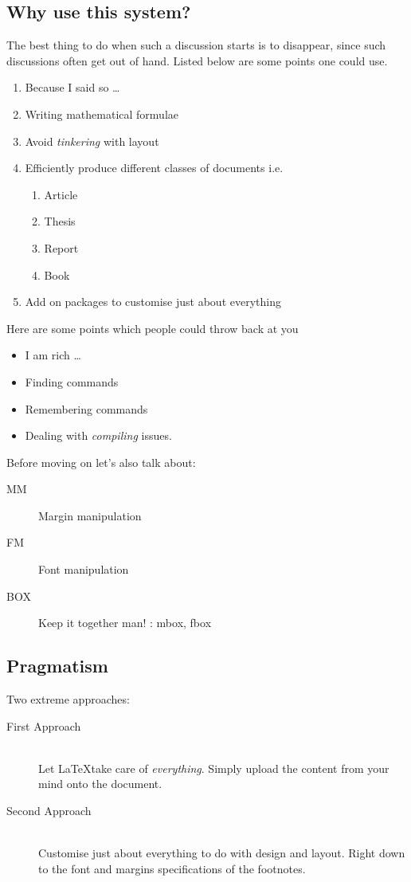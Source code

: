 \documentclass{article}
\begin{document}
\subsection{Why use this system?}
The best thing to do when such a discussion starts is to disappear, since such discussions often get out of hand.
Listed below are some points one could use.
\begin{enumerate}
	\item Because I said so \dots
	\item Writing mathematical formulae
	\item Avoid \emph{tinkering} with layout
	\item Efficiently produce different classes of documents i.e.
	\begin{enumerate}
		\item Article
		\item Thesis
		\item Report
		\item Book
	\end{enumerate}
	\item Add on packages to customise just about everything
\end{enumerate}
Here are some points which people could throw back at you
\begin{itemize}
	\item I am rich \dots
	\item Finding commands
	\item Remembering commands
	\item Dealing with \emph{compiling} issues.
\end{itemize}

\par
Before moving on let's also talk about: 
\begin{description}
	\item [MM] Margin manipulation
	\item [FM] {\Huge{Font manipulation}}
	\item [BOX] Keep it together man! : mbox, fbox
\end{description}

\subsection{Pragmatism}
Two extreme approaches:
\begin{description}
	\item[First Approach] \hfill \\
	Let \LaTeX take care of \emph{everything}. Simply upload the content from your mind onto the document.
	\item[Second Approach] \hfill \\
	Customise just about everything to do with design and layout. Right down to the font and margins specifications of the footnotes.
\end{description}
\end{document}
